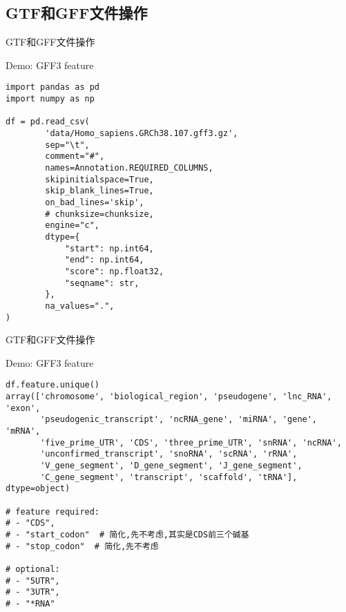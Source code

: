 \subsection{GTF和GFF文件操作}

\begin{frame}[standout] GTF和GFF文件操作 \end{frame}

\begin{frame}[fragile]{Demo: GFF3 feature}
    \begin{lstlisting}
import pandas as pd
import numpy as np

df = pd.read_csv(
        'data/Homo_sapiens.GRCh38.107.gff3.gz',
        sep="\t",
        comment="#",
        names=Annotation.REQUIRED_COLUMNS,
        skipinitialspace=True,
        skip_blank_lines=True,
        on_bad_lines='skip',
        # chunksize=chunksize,
        engine="c",
        dtype={
            "start": np.int64,
            "end": np.int64,
            "score": np.float32,
            "seqname": str,
        },
        na_values=".",
)
    \end{lstlisting}
\end{frame}

\begin{frame}[standout] GTF和GFF文件操作 \end{frame}

\begin{frame}[fragile]{Demo: GFF3 feature}
    \begin{lstlisting}
df.feature.unique()
array(['chromosome', 'biological_region', 'pseudogene', 'lnc_RNA', 'exon',
       'pseudogenic_transcript', 'ncRNA_gene', 'miRNA', 'gene', 'mRNA',
       'five_prime_UTR', 'CDS', 'three_prime_UTR', 'snRNA', 'ncRNA',
       'unconfirmed_transcript', 'snoRNA', 'scRNA', 'rRNA',
       'V_gene_segment', 'D_gene_segment', 'J_gene_segment',
       'C_gene_segment', 'transcript', 'scaffold', 'tRNA'], dtype=object)

# feature required: 
# - "CDS", 
# - "start_codon"  # 简化,先不考虑,其实是CDS前三个碱基
# - "stop_codon"  # 简化,先不考虑

# optional:
# - "5UTR", 
# - "3UTR",
# - "*RNA"
    \end{lstlisting}
\end{frame}


